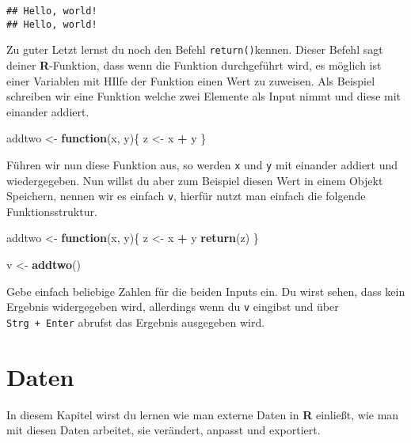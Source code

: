 \documentclass[
]{book}
\newenvironment{Shaded}{\begin{snugshade}}{\end{snugshade}}
\newcommand{\ControlFlowTok}[1]{\textcolor[rgb]{0.13,0.29,0.53}{\textbf{#1}}}
\newcommand{\KeywordTok}[1]{\textcolor[rgb]{0.13,0.29,0.53}{\textbf{#1}}}
\newcommand{\NormalTok}[1]{#1}
\newcommand{\OperatorTok}[1]{\textcolor[rgb]{0.81,0.36,0.00}{\textbf{#1}}}
\newcommand{\StringTok}[1]{\textcolor[rgb]{0.31,0.60,0.02}{#1}}
\begin{document}
\begin{verbatim}
## Hello, world!
## Hello, world!
\end{verbatim}

Zu guter Letzt lernst du noch den Befehl \texttt{return()}kennen.
Dieser Befehl sagt deiner \textbf{R}-Funktion, dass wenn die Funktion durchgeführt wird, es möglich ist einer Variablen mit HIlfe der Funktion einen Wert zu zuweisen.
Als Beispiel schreiben wir eine Funktion welche zwei Elemente als Input nimmt und diese mit einander addiert.

\begin{Shaded}
\begin{Highlighting}[]
\NormalTok{addtwo <-}\StringTok{ }\ControlFlowTok{function}\NormalTok{(x, y)\{}
\NormalTok{  z <-}\StringTok{ }\NormalTok{x }\OperatorTok{+}\StringTok{ }\NormalTok{y}
\NormalTok{\}}
\end{Highlighting}
\end{Shaded}

Führen wir nun diese Funktion aus, so werden \texttt{x} und \texttt{y} mit einander addiert und wiedergegeben. Nun willst du aber zum Beispiel diesen Wert in einem Objekt Speichern, nennen wir es einfach \texttt{v}, hierfür nutzt man einfach die folgende Funktionsstruktur.

\begin{Shaded}
\begin{Highlighting}[]
\NormalTok{addtwo <-}\StringTok{ }\ControlFlowTok{function}\NormalTok{(x, y)\{}
\NormalTok{  z <-}\StringTok{ }\NormalTok{x }\OperatorTok{+}\StringTok{ }\NormalTok{y}
  \KeywordTok{return}\NormalTok{(z)}
\NormalTok{\}}

\NormalTok{v <-}\StringTok{ }\KeywordTok{addtwo}\NormalTok{()}
\end{Highlighting}
\end{Shaded}

Gebe einfach beliebige Zahlen für die beiden Inputs ein. Du wirst sehen, dass kein Ergebnis widergegeben wird, allerdings wenn du \texttt{v} eingibst und über \texttt{Strg\ +\ Enter} abrufst das Ergebnis ausgegeben wird.

\hypertarget{daten}{%
\chapter{Daten}\label{daten}}

In diesem Kapitel wirst du lernen wie man externe Daten in \textbf{R} einließt, wie man mit diesen Daten arbeitet, sie verändert, anpasst und exportiert.
\end{document}
